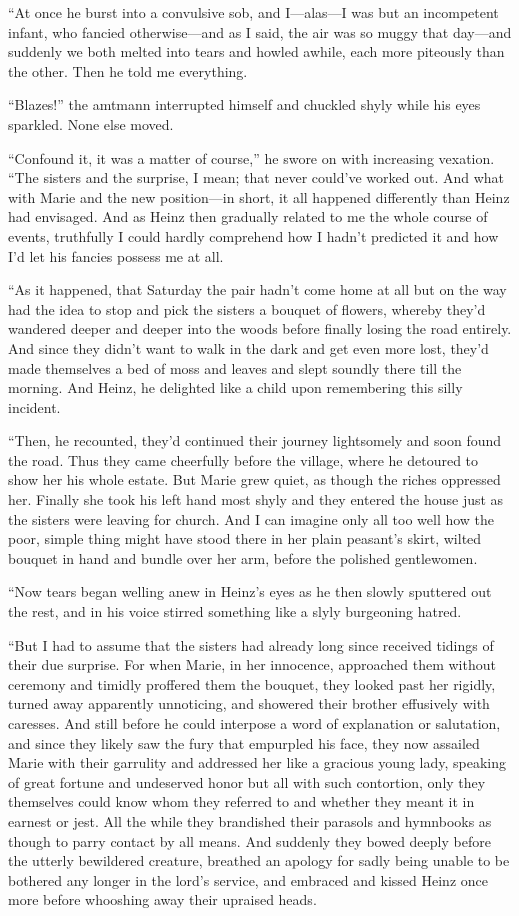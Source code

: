 \documentclass[12pt,a4paper]{article}
\begin{document}
“At once he burst into a convulsive sob, and I—alas—I was but an incompetent infant, who fancied otherwise—and as I said, the air was so muggy that day—and suddenly we both melted into tears and howled awhile, each more piteously than the other. Then he told me everything.

“Blazes!” the amtmann interrupted himself and chuckled shyly while his eyes sparkled. None else moved.

“Confound it, it was a matter of course,” he swore on with increasing vexation. “The sisters and the surprise, I mean; that never could’ve worked out. And what with Marie and the new position—in short, it all happened differently than Heinz had envisaged. And as Heinz then gradually related to me the whole course of events, truthfully I could hardly comprehend how I hadn’t predicted it and how I’d let his fancies possess me at all.

“As it happened, that Saturday the pair hadn’t come home at all but on the way had the idea to stop and pick the sisters a bouquet of flowers, whereby they’d wandered deeper and deeper into the woods before finally losing the road entirely. And since they didn’t want to walk in the dark and get even more lost, they’d made themselves a bed of moss and leaves and slept soundly there till the morning. And Heinz, he delighted like a child upon remembering this silly incident.

“Then, he recounted, they’d continued their journey lightsomely and soon found the road. Thus they came cheerfully before the village, where he detoured to show her his whole estate. But Marie grew quiet, as though the riches oppressed her. Finally she took his left hand most shyly and they entered the house just as the sisters were leaving for church. And I can imagine only all too well how the poor, simple thing might have stood there in her plain peasant’s skirt, wilted bouquet in hand and bundle over her arm, before the polished gentlewomen.

“Now tears began welling anew in Heinz’s eyes as he then slowly sputtered out the rest, and in his voice stirred something like a slyly burgeoning hatred.

“But I had to assume that the sisters had already long since received tidings of their due surprise. For when Marie, in her innocence, approached them without ceremony and timidly proffered them the bouquet, they looked past her rigidly, turned away apparently unnoticing, and showered their brother effusively with caresses. And still before he could interpose a word of explanation or salutation, and since they likely saw the fury that empurpled his face, they now assailed Marie with their garrulity and addressed her like a gracious young lady, speaking of great fortune and undeserved honor but all with such contortion, only they themselves could know whom they referred to and whether they meant it in earnest or jest. All the while they brandished their parasols and hymnbooks as though to parry contact by all means. And suddenly they bowed deeply before the utterly bewildered creature, breathed an apology for sadly being unable to be bothered any longer in the lord’s service, and embraced and kissed Heinz once more before whooshing away their upraised heads.
\end{document}
